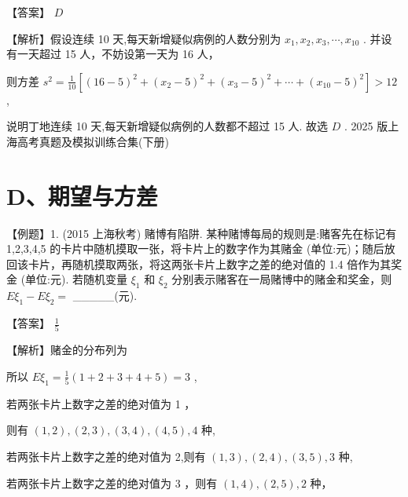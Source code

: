 \documentclass[10pt]{article}
\begin{document}
【答案】 \(D\)

【解析】假设连续 10 天,每天新增疑似病例的人数分别为 \({x}_{1},{x}_{2},{x}_{3},\cdots ,{x}_{10}\) . 并设有一天超过 15 人，不妨设第一天为 16 人，

则方差 \({s}^{2} = \frac{1}{10}\left\lbrack  {{\left( {16} - 5\right) }^{2} + {\left( {x}_{2} - 5\right) }^{2} + {\left( {x}_{3} - 5\right) }^{2} + \cdots  + {\left( {x}_{10} - 5\right) }^{2}}\right\rbrack   > {12}\) ,

说明丁地连续 10 天,每天新增疑似病例的人数都不超过 15 人. 故选 \(D\) . 2025 版上海高考真题及模拟训练合集(下册)

\section*{D、期望与方差}

【例题】1. (2015 上海秋考) 赌博有陷阱. 某种赌博每局的规则是:赌客先在标记有 1,2,3,4,5 的卡片中随机摸取一张，将卡片上的数字作为其赌金 (单位:元)；随后放回该卡片，再随机摸取两张，将这两张卡片上数字之差的绝对值的 1.4 倍作为其奖金 (单位:元). 若随机变量 \({\xi }_{1}\) 和 \({\xi }_{2}\) 分别表示赌客在一局赌博中的赌金和奖金，则 \(E{\xi }_{1} - E{\xi }_{2} =\) \_\_\_\_\_(元).

【答案】 \(\frac{1}{5}\)

【解析】赌金的分布列为

\begin{center}
\end{center}

所以 \(E{\xi }_{1} = \frac{1}{5}\left( {1 + 2 + 3 + 4 + 5}\right)  = 3\) ,

若两张卡片上数字之差的绝对值为 1 ，

则有 \(\left( {1,2}\right) ,\left( {2,3}\right) ,\left( {3,4}\right) ,\left( {4,5}\right) ,4\) 种,

若两张卡片上数字之差的绝对值为 2,则有 \(\left( {1,3}\right) ,\left( {2,4}\right) ,\left( {3,5}\right) ,3\) 种,

若两张卡片上数字之差的绝对值为 3 ，则有 \(\left( {1,4}\right) ,\left( {2,5}\right) ,2\) 种，
\end{document}

